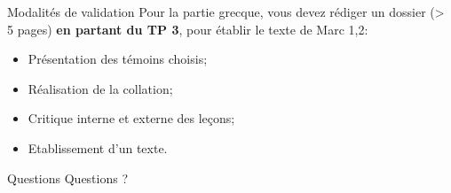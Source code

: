 \documentclass[11pt]{beamer}
\begin{document}
\begin{frame}{Modalités de validation}
    Pour la partie grecque, vous devez rédiger un dossier (> 5 pages) \textbf{en partant du TP 3}, pour établir le texte de Marc 1,2:
    \begin{itemize}
        \item Présentation des témoins choisis;
        \item Réalisation de la collation;
        \item Critique interne et externe des leçons;
        \item Etablissement d'un texte.
    \end{itemize}
\end{frame}

\begin{frame}{Questions}
Questions ?
\end{frame}
\end{document}
